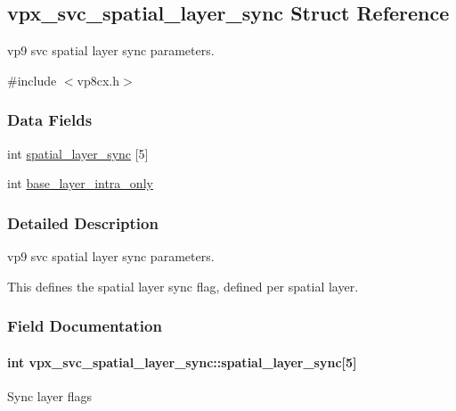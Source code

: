 \hypertarget{structvpx__svc__spatial__layer__sync}{}\subsection{vpx\+\_\+svc\+\_\+spatial\+\_\+layer\+\_\+sync Struct Reference}
\label{structvpx__svc__spatial__layer__sync}


vp9 svc spatial layer sync parameters.  




{\ttfamily \#include $<$vp8cx.\+h$>$}

\subsubsection*{Data Fields}
\begin{DoxyCompactItemize}
\item 
int \hyperlink{structvpx__svc__spatial__layer__sync_a341e5c98b4e4006af5423ccf78aea798}{spatial\+\_\+layer\+\_\+sync} \mbox{[}5\mbox{]}
\item 
int \hyperlink{structvpx__svc__spatial__layer__sync_a35731bf99cd1bc7e52f5e3f84f9b22dc}{base\+\_\+layer\+\_\+intra\+\_\+only}
\end{DoxyCompactItemize}


\subsubsection{Detailed Description}
vp9 svc spatial layer sync parameters. 

This defines the spatial layer sync flag, defined per spatial layer. 

\subsubsection{Field Documentation}
\paragraph[{\texorpdfstring{spatial\+\_\+layer\+\_\+sync}{spatial_layer_sync}}]{\setlength{\rightskip}{0pt plus 5cm}int vpx\+\_\+svc\+\_\+spatial\+\_\+layer\+\_\+sync\+::spatial\+\_\+layer\+\_\+sync\mbox{[}5\mbox{]}}\hypertarget{structvpx__svc__spatial__layer__sync_a341e5c98b4e4006af5423ccf78aea798}{}\label{structvpx__svc__spatial__layer__sync_a341e5c98b4e4006af5423ccf78aea798}
Sync layer flags 
